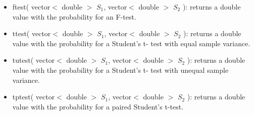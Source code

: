 \documentclass{report}
\begin{document}
\begin{itemize}
\item ftest( vector$<$ double $>$ $S_1$, vector$<$ double $>$ $S_2$ ):
      returns a double value with the probability for an F-test.
\item ttest( vector$<$ double $>$ $S_1$, vector$<$ double $>$ $S_2$ ):
      returns a double value with the probability for a Student's t-
      test
      with equal sample variance.
\item tutest( vector$<$ double $>$ $S_1$, vector$<$ double $>$ $S_2$
):
      returns a double value with the probability for a Student's t-
      test
      with unequal sample variance.
\item tptest( vector$<$ double $>$ $S_1$, vector$<$ double $>$ $S_2$
):
      returns a double value with the probability for a paired
      Student's
      t-test.
\end{itemize}
\end{document}
